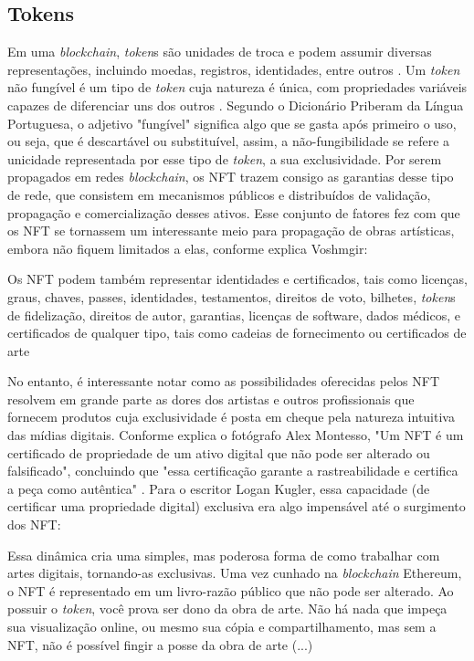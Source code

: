 \subsection{Tokens}
\label{subsec: tokens}
Em uma \textit{blockchain}, \textit{token}s são unidades de troca e podem assumir diversas representações, incluindo moedas, registros, identidades, entre outros \cite{Antonopoulos, Voshmgir}. Um \textit{token} não fungível é um tipo de \textit{token} cuja natureza é única, com propriedades variáveis capazes de diferenciar uns dos outros \cite{Voshmgir}. Segundo o Dicionário Priberam da Língua Portuguesa, o adjetivo "fungível" significa algo que se gasta após primeiro o uso, ou seja, que é descartável ou substituível, assim, a não-fungibilidade se refere a unicidade representada por esse tipo de \textit{token}, a sua exclusividade. Por serem propagados em redes \textit{blockchain}, os NFT trazem consigo as garantias desse tipo de rede, que consistem em mecanismos públicos e distribuídos de validação, propagação e comercialização desses ativos. Esse conjunto de fatores fez com que os NFT se tornassem um interessante meio para propagação de obras artísticas, embora não fiquem limitados a elas, conforme explica Voshmgir:

\begin{citacao}
	 Os NFT podem também representar identidades e certificados, tais como licenças, graus, chaves, passes, identidades, testamentos, direitos de voto, bilhetes, \textit{token}s de fidelização, direitos de autor, garantias, licenças de software, dados médicos, e certificados de qualquer tipo, tais como cadeias de fornecimento ou certificados de arte \cite{Voshmgir}
\end{citacao}

No entanto, é interessante notar como as possibilidades oferecidas pelos NFT resolvem em grande parte as dores dos artistas e outros profissionais que fornecem produtos cuja exclusividade é posta em cheque pela natureza intuitiva das mídias digitais. Conforme explica o fotógrafo Alex Montesso, "Um NFT é um certificado de propriedade de um ativo digital que não pode ser alterado ou falsificado", concluindo que "essa certificação garante a rastreabilidade e certifica a peça como autêntica" \cite{Montesso}. Para o escritor Logan Kugler, essa capacidade (de certificar uma propriedade digital) exclusiva era algo impensável até o surgimento dos NFT: 

\begin{citacao}
Essa dinâmica cria uma simples, mas poderosa forma de como trabalhar com artes digitais, tornando-as exclusivas. Uma vez cunhado na \textit{blockchain} Ethereum, o NFT é representado em um livro-razão público que não pode ser alterado. Ao possuir o \textit{token}, você prova ser dono da obra de arte. Não há nada que impeça sua visualização online, ou mesmo sua cópia e compartilhamento, mas sem a NFT, não é possível fingir a posse da obra de arte (...) \cite{Kugler}
\end{citacao}

